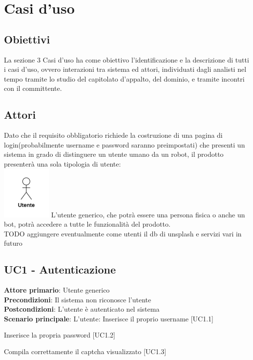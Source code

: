\section{Casi d'uso}

\subsection{Obiettivi}
La sezione 3 Casi d'uso ha come obiettivo l'identificazione e la descrizione di tutti i casi d'uso, ovvero interazioni tra sistema ed attori, individuati dagli analisti nel tempo tramite lo studio del capitolato d'appalto, del dominio, e tramite incontri con il committente.

\subsection{Attori}
Dato che il requisito obbligatorio richiede la costruzione di una pagina di login(probabilmente username e password saranno preimpostati) che presenti un sistema in grado di distinguere un utente umano da un robot, il prodotto presenterà una sola tipologia di utente:\\
\includegraphics[scale = 1]{img/attori1.png}
L'utente generico, che potrà essere una persona fisica o anche un bot, potrà accedere a tutte le funzionalità del prodotto. \\
TODO aggiungere eventualmente come utenti il db di unsplash e servizi vari in futuro

\subsection{UC1 - Autenticazione}
\textbf{Attore primario}: Utente generico\\
\textbf{Precondizioni}: Il sistema non riconosce l'utente\\
\textbf{Postcondizioni}: L'utente è autenticato nel sistema\\

\textbf{Scenario principale}: L'utente:
	Inserisce il proprio username [UC1.1]

	Inserisce la propria password [UC1.2]

	Compila correttamente il captcha visualizzato [UC1.3]

